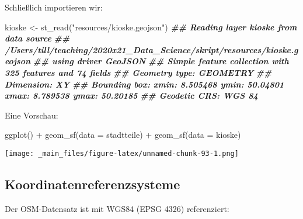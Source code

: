 \documentclass[
  ngerman,
]{article}
\newenvironment{Shaded}{\begin{snugshade}}{\end{snugshade}}
\newcommand{\AttributeTok}[1]{\textcolor[rgb]{0.77,0.63,0.00}{#1}}
\newcommand{\DocumentationTok}[1]{\textcolor[rgb]{0.56,0.35,0.01}{\textbf{\textit{#1}}}}
\newcommand{\FunctionTok}[1]{\textcolor[rgb]{0.00,0.00,0.00}{#1}}
\newcommand{\NormalTok}[1]{#1}
\newcommand{\OtherTok}[1]{\textcolor[rgb]{0.56,0.35,0.01}{#1}}
\newcommand{\SpecialCharTok}[1]{\textcolor[rgb]{0.00,0.00,0.00}{#1}}
\newcommand{\StringTok}[1]{\textcolor[rgb]{0.31,0.60,0.02}{#1}}
\begin{document}
Schließlich importieren wir:

\begin{Shaded}
\begin{Highlighting}[]
\NormalTok{kioske }\OtherTok{\textless{}{-}} \FunctionTok{st\_read}\NormalTok{(}\StringTok{"resources/kioske.geojson"}\NormalTok{)}
\DocumentationTok{\#\# Reading layer \textasciigrave{}kioske\textquotesingle{} from data source }
\DocumentationTok{\#\#   \textasciigrave{}/Users/till/teaching/2020x21\_Data\_Science/skript/resources/kioske.geojson\textquotesingle{} }
\DocumentationTok{\#\#   using driver \textasciigrave{}GeoJSON\textquotesingle{}}
\DocumentationTok{\#\# Simple feature collection with 325 features and 74 fields}
\DocumentationTok{\#\# Geometry type: GEOMETRY}
\DocumentationTok{\#\# Dimension:     XY}
\DocumentationTok{\#\# Bounding box:  xmin: 8.505468 ymin: 50.04801 xmax: 8.789538 ymax: 50.20185}
\DocumentationTok{\#\# Geodetic CRS:  WGS 84}
\end{Highlighting}
\end{Shaded}

Eine Vorschau:

\begin{Shaded}
\begin{Highlighting}[]
\FunctionTok{ggplot}\NormalTok{() }\SpecialCharTok{+}
  \FunctionTok{geom\_sf}\NormalTok{(}\AttributeTok{data =}\NormalTok{ stadtteile) }\SpecialCharTok{+}
  \FunctionTok{geom\_sf}\NormalTok{(}\AttributeTok{data =}\NormalTok{ kioske)}
\end{Highlighting}
\end{Shaded}

\texttt{[image: \_main\_files/figure-latex/unnamed-chunk-93-1.png]}

\hypertarget{koordinatenreferenzsysteme}{%
\subsection{Koordinatenreferenzsysteme}\label{koordinatenreferenzsysteme}}

Der OSM-Datensatz ist mit WGS84 (EPSG 4326) referenziert:
\end{document}
